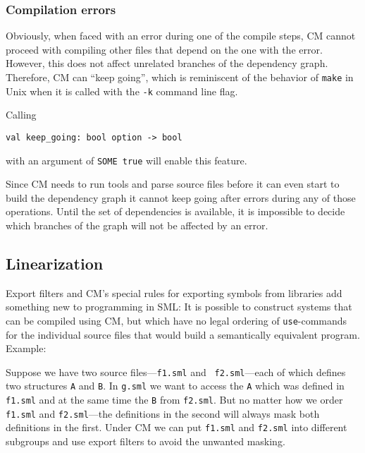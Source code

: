 \documentclass{article}
\begin{document}
\subsubsection{Compilation errors}

Obviously, when faced with an error during one of the compile steps,
CM cannot proceed with compiling other files that depend on the one
with the error.  However, this does not affect unrelated branches of
the dependency graph.  Therefore, CM can ``keep going'', which
is reminiscent of the behavior of {\tt make} in {\sc Unix} when
it is called with the {\tt -k} command line flag.

Calling

\begin{verbatim}
val keep_going: bool option -> bool
\end{verbatim}

with an argument of {\tt SOME true} will enable this feature.

Since CM needs to run tools and parse source files before it can
even start to build the dependency graph it cannot keep going
after errors during any of those operations.  Until the set of
dependencies is available, it is impossible to decide which
branches of the graph will not be affected by an error.

\subsection{Linearization}

Export filters and CM's special rules for exporting symbols from
libraries add something new to programming in SML: It is possible to
construct systems that can be compiled using CM, but which have no
legal ordering of {\tt use}-commands for the individual source files
that would build a semantically equivalent program.
Example:

Suppose we have two source files---{\tt f1.sml} and {\tt
f2.sml}---each of which defines two structures {\tt A} and {\tt B}.
In {\tt g.sml} we want to access the {\tt A} which was defined in {\tt
f1.sml} and at the same time the {\tt B} from {\tt f2.sml}.  But no
matter how we order {\tt f1.sml} and {\tt f2.sml}---the definitions in
the second will always mask both definitions in the first.
Under CM we can put {\tt f1.sml} and {\tt f2.sml} into different
subgroups and use export filters to avoid the unwanted masking.
\end{document}
